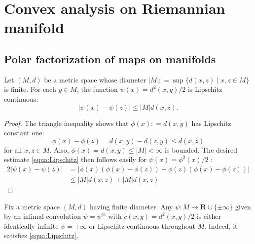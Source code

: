 \section{Convex analysis on Riemannian manifold}
\subsection{Polar factorization of maps on manifolds}

\begin{lem} 
	\label{lem:Lipschitz_cost}
	Let \( ( M , d ) \) be a metric space whose diameter \( | M | : = \sup \{ d ( x , z ) \mid x , z \in M \} \) is finite.
	For each \( y \in M \), the function \( \psi ( x ) = d ^ { 2 } ( x , y ) / 2 \) is Lipschitz continuous:
	\begin{equation}
		\label{equa:Lipschitz}
		| \psi ( x ) - \psi ( z ) | \leq | M | d ( x , z ).
	\end{equation}
\end{lem}

\begin{proof}
	The triangle inequality shows that \( \phi ( x ) : = d ( x , y ) \) has Lipschitz constant one:
	\[ \phi ( x ) - \phi ( z ) = d ( x , y ) - d ( z , y ) \leq d ( x , z ) \]
	for all \( x , z \in M\).
	Also, \( \phi ( x ) = d ( x , y ) \leq | M | < \infty \) is bounded.
	The desired estimate \cref{equa:Lipschitz} then follows easily for \( \psi ( x ) = \phi ^ { 2 } ( x ) / 2 \) :
	\begin{align*}
		2 | \psi ( x ) - \psi ( z ) | & = | \phi ( x ) ( \phi ( x ) - \phi ( z ) ) + \phi ( z ) ( \phi ( x ) - \phi ( z ) ) | \\
		                              & \leq | M | d ( x , z ) + | M | d ( x , z )
	\end{align*}
\end{proof}

\begin{lem} 
	\label{lem:infimal_convolution_Lipschitz}
	Fix a metric space \( ( M , d ) \) having finite diameter.
	Any \( \psi : M \rightarrow \mathbf { R } \cup \{ \pm \infty \} \) given by an infimal convolution \( \psi = \psi ^ { c c } \) with \( c ( x , y ) = d ^ { 2 } ( x , y ) / 2 \) is either identically infinite \( \psi = \pm \infty \) or Lipschitz continuous throughout \( M\).
	Indeed, it satisfies \cref{equa:Lipschitz}.
\end{lem}

